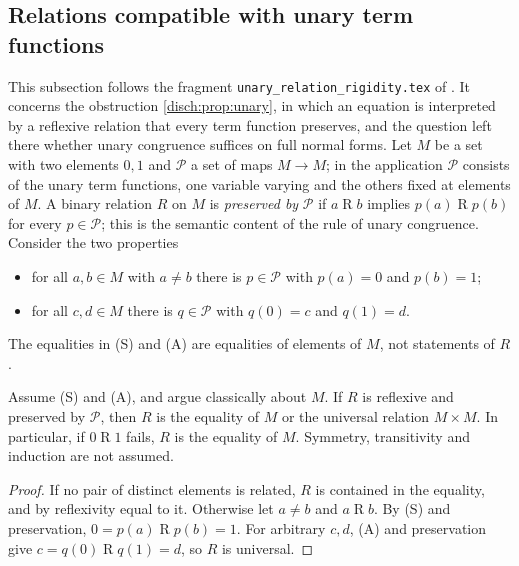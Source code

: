 \subsection{Relations compatible with unary term functions}\label{cert:sec:unary-rigid}

This subsection follows the fragment \texttt{unary\_relation\_rigidity.tex} of
. It concerns the obstruction \cref{disch:prop:unary}, in which an
equation is interpreted by a reflexive relation that every term function
preserves, and the question left there whether unary congruence suffices on
full normal forms. Let $M$ be a set with two elements $0,1$ and $\mathcal P$ a
set of maps $M\to M$; in the application $\mathcal P$ consists of the unary term
functions, one variable varying and the others fixed at elements of $M$. A binary
relation $R$ on $M$ is \emph{preserved by} $\mathcal P$ if $a\mathrel Rb$ implies
$p(a)\mathrel Rp(b)$ for every $p\in\mathcal P$; this is the semantic content of
the rule of unary congruence. Consider the two properties
\begin{itemize}
\item[(S)] for all $a,b\in M$ with $a\neq b$ there is $p\in\mathcal P$ with
$p(a)=0$ and $p(b)=1$;
\item[(A)] for all $c,d\in M$ there is $q\in\mathcal P$ with $q(0)=c$ and
$q(1)=d$.
\end{itemize}
The equalities in (S) and (A) are equalities of elements of $M$, not
statements of $R$.

\begin{theorem}\label{cert:thm:unary-rigid}
Assume (S) and (A), and argue classically about $M$. If $R$ is reflexive and
preserved by $\mathcal P$, then $R$ is the equality of $M$ or the universal
relation $M\times M$. In particular, if $0\mathrel R1$ fails, $R$ is the
equality of $M$. Symmetry, transitivity and induction are not assumed.
\end{theorem}
\begin{proof}
If no pair of distinct elements is related, $R$ is contained in the equality,
and by reflexivity equal to it. Otherwise let $a\neq b$ and $a\mathrel Rb$. By (S)
and preservation, $0=p(a)\mathrel Rp(b)=1$. For arbitrary $c,d$, (A) and
preservation give $c=q(0)\mathrel Rq(1)=d$, so $R$ is universal.
\end{proof}

